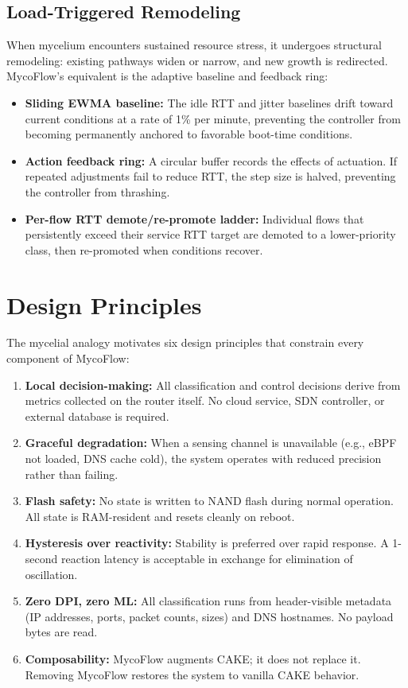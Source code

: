 \subsection{Load-Triggered Remodeling}

When mycelium encounters sustained resource stress, it undergoes structural remodeling: existing pathways widen or narrow, and new growth is redirected. MycoFlow's equivalent is the adaptive baseline and feedback ring:

\begin{itemize}
  \item \textbf{Sliding EWMA baseline:} The idle RTT and jitter baselines drift toward current conditions at a rate of 1\% per minute, preventing the controller from becoming permanently anchored to favorable boot-time conditions.
  \item \textbf{Action feedback ring:} A circular buffer records the effects of actuation. If repeated adjustments fail to reduce RTT, the step size is halved, preventing the controller from thrashing.
  \item \textbf{Per-flow RTT demote/re-promote ladder:} Individual flows that persistently exceed their service RTT target are demoted to a lower-priority class, then re-promoted when conditions recover.
\end{itemize}

\section{Design Principles}

The mycelial analogy motivates six design principles that constrain every component of MycoFlow:

\begin{enumerate}
  \item \textbf{Local decision-making:} All classification and control decisions derive from metrics collected on the router itself. No cloud service, SDN controller, or external database is required.
  \item \textbf{Graceful degradation:} When a sensing channel is unavailable (e.g., eBPF not loaded, DNS cache cold), the system operates with reduced precision rather than failing.
  \item \textbf{Flash safety:} No state is written to NAND flash during normal operation. All state is RAM-resident and resets cleanly on reboot.
  \item \textbf{Hysteresis over reactivity:} Stability is preferred over rapid response. A 1-second reaction latency is acceptable in exchange for elimination of oscillation.
  \item \textbf{Zero DPI, zero ML:} All classification runs from header-visible metadata (IP addresses, ports, packet counts, sizes) and DNS hostnames. No payload bytes are read.
  \item \textbf{Composability:} MycoFlow augments CAKE; it does not replace it. Removing MycoFlow restores the system to vanilla CAKE behavior.
\end{enumerate}
